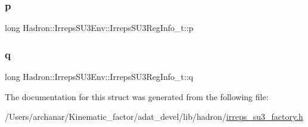 \subsubsection{\texorpdfstring{p}{p}}
{\footnotesize\ttfamily long Hadron\+::\+Irreps\+S\+U3\+Env\+::\+Irreps\+S\+U3\+Reg\+Info\+\_\+t\+::p}

\mbox{\label{structHadron_1_1IrrepsSU3Env_1_1IrrepsSU3RegInfo__t_a97db0daa2cc5a119261d02424f4979b6}} 
\subsubsection{\texorpdfstring{q}{q}}
{\footnotesize\ttfamily long Hadron\+::\+Irreps\+S\+U3\+Env\+::\+Irreps\+S\+U3\+Reg\+Info\+\_\+t\+::q}



The documentation for this struct was generated from the following file\+:\begin{DoxyCompactItemize}
\item 
/\+Users/archanar/\+Kinematic\+\_\+factor/adat\+\_\+devel/lib/hadron/\mbox{\hyperlink{lib_2hadron_2irreps__su3__factory_8h}{irreps\+\_\+su3\+\_\+factory.\+h}}\end{DoxyCompactItemize}
